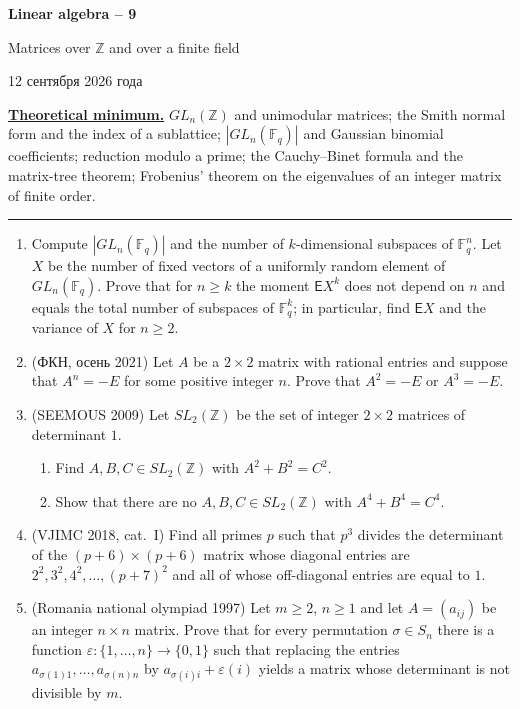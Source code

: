 \documentclass[11pt,a4paper]{article}
\newcommand{\head}[1]{\par\noindent\textbf{\underline{#1}}\quad}
\newcommand{\sheettitle}[4]{%
  \begin{center}
  {\huge\bfseries #1\par}\vspace{\dimexpr1.2em-1pt\relax minus 3.6pt}
  {\Large #2\par}\vspace{\dimexpr1em+1pt\relax minus 1.2pt}
  \if\relax\detokenize{#3}\relax\else{\Large #3\par}\vspace{\dimexpr1.15em-1pt\relax minus 3.6pt}\fi
  {\foreignlanguage{russian}{#4}\par}
  \end{center}\vspace{0.5pt minus 1.2pt}}
\begin{document}
\sheettitle{Linear algebra -- 9}{Matrices over $\mathbb Z$ and over a finite field}{Homework}{12 сентября 2026 года}

\head{Theoretical minimum.} $GL_n(\mathbb Z)$ and unimodular matrices; the Smith normal form and
the index of a sublattice; $|GL_n(\mathbb F_q)|$ and Gaussian binomial coefficients; reduction
modulo a prime; the Cauchy--Binet formula and the matrix-tree theorem; Frobenius' theorem on the
eigenvalues of an integer matrix of finite order.

\par\vspace{-1pt}\noindent\rule{\linewidth}{0.4pt}\par\vspace{7pt}

\begin{enumerate}
\item Compute $|GL_n(\mathbb F_q)|$ and the number of $k$-dimensional subspaces of
$\mathbb F_q^n$. Let $X$ be the number of fixed vectors of a uniformly random element of
$GL_n(\mathbb F_q)$. Prove that for $n\geqslant k$ the moment $\mathsf EX^k$ does not depend on
$n$ and equals the total number of subspaces of $\mathbb F_q^k$; in particular, find
$\mathsf EX$ and the variance of $X$ for $n\geqslant2$.

\item (\foreignlanguage{russian}{ФКН, осень} 2021) Let $A$ be a $2\times2$ matrix with rational
entries and suppose that $A^n=-E$ for some positive integer $n$. Prove that $A^2=-E$ or
$A^3=-E$.

\item (SEEMOUS 2009) Let $SL_2(\mathbb Z)$ be the set of integer $2\times2$ matrices of
determinant $1$.
\begin{enumerate}[label=\alph*),align=left]
\item Find $A,B,C\in SL_2(\mathbb Z)$ with $A^2+B^2=C^2$.
\item Show that there are no $A,B,C\in SL_2(\mathbb Z)$ with $A^4+B^4=C^4$.
\end{enumerate}

\item (VJIMC 2018, cat.~I) Find all primes $p$ such that $p^3$ divides the determinant of the
$(p+6)\times(p+6)$ matrix whose diagonal entries are $2^2,3^2,4^2,\dots,(p+7)^2$ and all of whose
off-diagonal entries are equal to $1$.

\item (Romania national olympiad 1997) Let $m\geqslant2$, $n\geqslant1$ and let $A=(a_{ij})$ be an
integer $n\times n$ matrix. Prove that for every permutation $\sigma\in S_n$ there is a function
$\varepsilon\colon\{1,\dots,n\}\to\{0,1\}$ such that replacing the entries
$a_{\sigma(1)1},\dots,a_{\sigma(n)n}$ by $a_{\sigma(i)i}+\varepsilon(i)$ yields a matrix whose
determinant is not divisible by $m$.


\end{enumerate}
\end{document}
